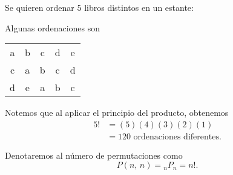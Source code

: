 \begin{myexample}
    Se quieren ordenar 5 libros distintos en un estante:
    \begin{center}
    \end{center}
    Algunas ordenaciones son
    \begin{center}
        \begin{tabular}{ccccc}
            a & b & c & d & e \\
            c & a & b & c & d \\
            d & e & a & b & c
        \end{tabular}
    \end{center}
    Notemos que al aplicar el principio del producto, obtenemos
    \begin{align*}
        5! & = (5)(4)(3)(2)(1) \\
        & = 120 \text{ ordenaciones diferentes.}
    \end{align*}
\end{myexample}

\begin{notation*}{}
    Denotaremos al número de permutaciones como
    $$P(n, \, n) = {}_nP_n = n!.$$
\end{notation*}

